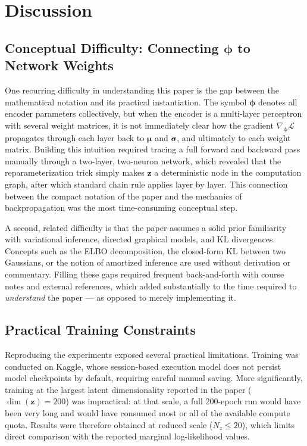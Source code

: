 \documentclass{article}
\begin{document}
\section{Discussion}

\subsection{Conceptual Difficulty: Connecting $\boldsymbol{\phi}$ to Network Weights}
One recurring difficulty in understanding this paper is the gap between the
mathematical notation and its practical instantiation. The symbol $\boldsymbol{\phi}$
denotes all encoder parameters collectively, but when the encoder is a multi-layer
perceptron with several weight matrices, it is not immediately clear how the gradient
$\nabla_{\boldsymbol{\phi}} \mathcal{L}$ propagates through each layer back to
$\boldsymbol{\mu}$ and $\boldsymbol{\sigma}$, and ultimately to each weight matrix.
Building this intuition required tracing a full forward and backward pass manually
through a two-layer, two-neuron network, which revealed that the reparameterization
trick simply makes $\mathbf{z}$ a deterministic node in the computation graph, after
which standard chain rule applies layer by layer. This connection between
the compact notation of the paper and the mechanics of backpropagation was the
most time-consuming conceptual step.

A second, related difficulty is that the paper assumes a solid prior familiarity
with variational inference, directed graphical models, and KL divergences.
Concepts such as the ELBO decomposition, the closed-form KL between two Gaussians,
or the notion of amortized inference are used without derivation or commentary.
Filling these gaps required frequent back-and-forth with course notes and external
references, which added substantially to the time required to \emph{understand}
the paper --- as opposed to merely implementing it.

\subsection{Practical Training Constraints}
Reproducing the experiments exposed several practical limitations. Training was
conducted on Kaggle, whose session-based execution model does not persist
model checkpoints by default, requiring careful manual saving. More significantly,
training at the largest latent dimensionality reported in the paper
($\dim(\mathbf{z}) = 200$) was impractical: at that scale, a full 200-epoch run
would have been very long and would have consumed most or all of the available
compute quota. Results were therefore obtained at reduced scale ($N_z \leq 20$),
which limits direct comparison with the reported marginal log-likelihood values.
\end{document}
